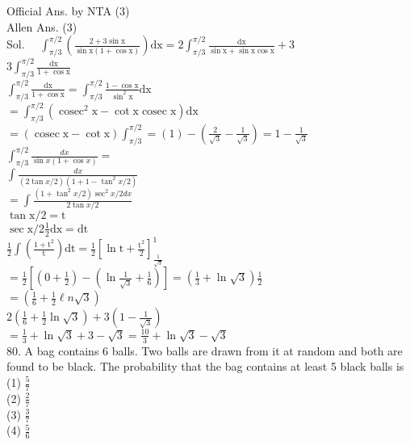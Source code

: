 \documentclass[10pt]{article}
\begin{document}
Official Ans. by NTA (3)\\
Allen Ans. (3)\\
Sol. \(\quad \int_{\pi / 3}^{\pi / 2}\left(\frac{2+3 \sin \mathrm{x}}{\sin \mathrm{x}(1+\cos \mathrm{x})}\right) \mathrm{dx}=2 \int_{\pi / 3}^{\pi / 2} \frac{\mathrm{dx}}{\sin \mathrm{x}+\sin \mathrm{x} \cos \mathrm{x}}+3\)\\
\(3 \int_{\pi / 3}^{\pi / 2} \frac{\mathrm{dx}}{1+\cos \mathrm{x}}\)\\
\(\int_{\pi / 3}^{\pi / 2} \frac{\mathrm{dx}}{1+\cos \mathrm{x}}=\int_{\pi / 3}^{\pi / 2} \frac{1-\cos \mathrm{x}}{\sin ^{2} \mathrm{x}} \mathrm{dx}\)\\
\(=\int_{\pi / 3}^{\pi / 2}\left(\operatorname{cosec}^{2} \mathrm{x}-\cot \mathrm{x} \operatorname{cosec} \mathrm{x}\right) \mathrm{dx}\)\\
\(=(\operatorname{cosec} \mathrm{x}-\cot \mathrm{x}) \int_{\pi / 3}^{\pi / 2}=(1)-\left(\frac{2}{\sqrt{3}}-\frac{1}{\sqrt{3}}\right)=1-\frac{1}{\sqrt{3}}\)\\
\(\int_{\pi / 3}^{\pi / 2} \frac{d x}{\sin x(1+\cos x)}=\)\\
\(\int \frac{d x}{(2 \tan x / 2)\left(1+1-\tan ^{2} x / 2\right)}\)\\
\(=\int \frac{\left(1+\tan ^{2} x / 2\right) \sec ^{2} x / 2 d x}{2 \tan x / 2}\)\\
\(\tan \mathrm{x} / 2=\mathrm{t}\)\\
\(\sec \mathrm{x} / 2 \frac{1}{2} \mathrm{dx}=\mathrm{dt}\)\\
\(\frac{1}{2} \int\left(\frac{1+\mathrm{t}^{2}}{\mathrm{t}}\right) \mathrm{dt}=\frac{1}{2}\left[\ln \mathrm{t}+\frac{\mathrm{t}^{2}}{2}\right]_{\frac{1}{\sqrt{3}}}^{1}\)\\
\(=\frac{1}{2}\left[\left(0+\frac{1}{2}\right)-\left(\ln \frac{1}{\sqrt{3}}+\frac{1}{6}\right)\right]=\left(\frac{1}{3}+\ln \sqrt{3}\right) \frac{1}{2}\)\\
\(=\left(\frac{1}{6}+\frac{1}{2} \ell n \sqrt{3}\right)\)\\
\(2\left(\frac{1}{6}+\frac{1}{2} \ln \sqrt{3}\right)+3\left(1-\frac{1}{\sqrt{3}}\right)\)\\
\(=\frac{1}{3}+\ln \sqrt{3}+3-\sqrt{3}=\frac{10}{3}+\ln \sqrt{3}-\sqrt{3}\)\\
80. A bag contains 6 balls. Two balls are drawn from it at random and both are found to be black. The probability that the bag contains at least 5 black balls is\\
(1) \(\frac{5}{7}\)\\
(2) \(\frac{2}{7}\)\\
(3) \(\frac{3}{7}\)\\
(4) \(\frac{5}{6}\)
\end{document}
